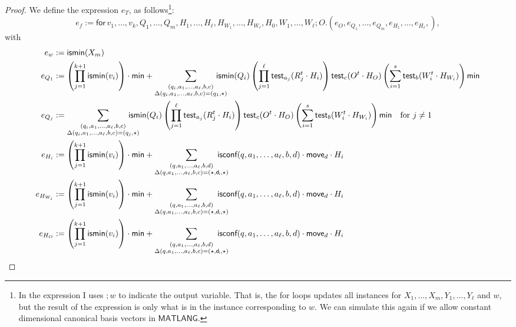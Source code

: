 \begin{proof}
We define the expression $e_T$, as follows\footnote{In the expression I uses $;w$ to indicate the output variable. That is, the for loops updates all instances for $X_1,\ldots,X_m,Y_1,\ldots,Y_\ell$ and $w$, but the result of the expression is only what is in the instance corresponding to $w$. We can simulate this again if we allow constant dimensional canonical basis vectors in $\mathsf{MATLANG}$.}:
$$
e_f:= \mathsf{for\,} v_1,\ldots,v_{k},Q_1,\ldots,Q_m,H_1,\ldots,H_\ell,H_{W_1},\ldots,H_{W_\ell},H_0, W_1,\ldots,W_\ell; O.(e_O,e_{Q_1},\ldots,e_{Q_m},e_{H_1},\ldots,e_{H_\ell},),
$$
with 
\begin{align*}\allowdisplaybreaks
	e_w&:=\mathsf{ismin}(X_m)\\
	e_{Q_1}&:=\left(\prod_{j=1}^{k+1} \textsf{ismin}(v_i)\right)\cdot\mathsf{min}
	+ \sum_{\substack{(q_i,a_1,\ldots,a_\ell,b,c)\\
	\Delta(q_i,a_1,\ldots,a_\ell,b,c)=(q_1,\star)}} \!\!\!\!\!\!\!\!\! \textsf{ismin}(Q_i)\left(\prod_{j=1}^\ell \mathsf{test}_{a_j}(R_j^t\cdot H_i)\right)\mathsf{test}_{c}(O^t\cdot H_O)
	\left(\sum_{i=1}^s \mathsf{test}_{b}(W_i^t\cdot H_{W_i})\right)\mathsf{min}\\
	e_{Q_j}&:=\sum_{\substack{(q_i,a_1,\ldots,a_\ell,b,c)\\
	\Delta(q_i,a_1,\ldots,a_\ell,b,c)=(q_j,\star)}} \!\!\!\!\!\!\!\!\! \textsf{ismin}(Q_i)\left(\prod_{j=1}^\ell \mathsf{test}_{a_j}(R_j^t\cdot H_i)\right)\mathsf{test}_{c}(O^t\cdot H_O)
	\left(\sum_{i=1}^s \mathsf{test}_{b}(W_i^t\cdot H_{W_i})\right)\mathsf{min}
	 \quad \text{for $j\neq 1$}\\
	e_{H_i}&:=\left(\prod_{j=1}^{k+1} \textsf{ismin}(v_i)\right)\cdot\mathsf{min}
	+\sum_{\substack{(q,a_1,\ldots,a_\ell,b,d)\\
	\Delta(q,a_1,\ldots,a_\ell,b,c)=(\star,\mathsf{d_i},\star)}}\!\!\!\!\!\!\!\!\! \textsf{isconf}(q,a_1,\ldots,a_\ell,b,d)\cdot\mathsf{move}_d\cdot H_i\\
	e_{H_{W_i}}&:=\left(\prod_{j=1}^{k+1} \textsf{ismin}(v_i)\right)\cdot\mathsf{min}
	+\sum_{\substack{(q,a_1,\ldots,a_\ell,b,d)\\
	\Delta(q,a_1,\ldots,a_\ell,b,c)=(\star,\mathsf{d_i},\star)}}\!\!\!\!\!\!\!\!\! \textsf{isconf}(q,a_1,\ldots,a_\ell,b,d)\cdot\mathsf{move}_d\cdot H_i\\
	e_{H_O}&:=\left(\prod_{j=1}^{k+1} \textsf{ismin}(v_i)\right)\cdot\mathsf{min}
	+\sum_{\substack{(q,a_1,\ldots,a_\ell,b,d)\\
	\Delta(q,a_1,\ldots,a_\ell,b,c)=(\star,\mathsf{d_i},\star)}}\!\!\!\!\!\!\!\!\! \textsf{isconf}(q,a_1,\ldots,a_\ell,b,d)\cdot\mathsf{move}_d\cdot H_i\\

\end{align*}
\end{proof}
